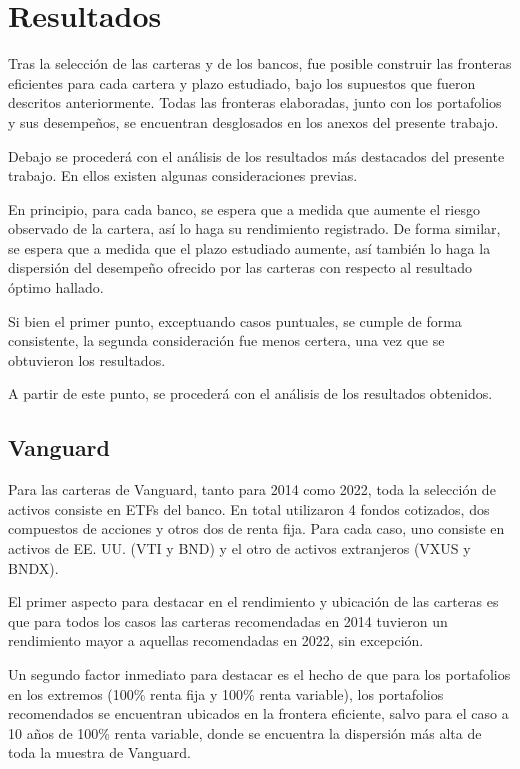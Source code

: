 \documentclass[a4paper,fleqn]{cas-sc}
\begin{document}
\section{Resultados}
Tras la selección de las carteras y de los bancos, fue posible construir las fronteras eficientes para cada cartera y plazo estudiado, bajo los supuestos que fueron descritos anteriormente. Todas las fronteras elaboradas, junto con los portafolios y sus desempeños, se encuentran desglosados en los anexos del presente trabajo. 

Debajo se procederá con el análisis de los resultados más destacados del presente trabajo. En ellos existen algunas consideraciones previas. 

En principio, para cada banco, se espera que a medida que aumente el riesgo observado de la cartera, así lo haga su rendimiento registrado. De forma similar, se espera que a medida que el plazo estudiado aumente, así también lo haga la dispersión del desempeño ofrecido por las carteras con respecto al resultado óptimo hallado. 

Si bien el primer punto, exceptuando casos puntuales, se cumple de forma consistente, la segunda consideración fue menos certera, una vez que se obtuvieron los resultados.

A partir de este punto, se procederá con el análisis de los resultados obtenidos.

\subsection{Vanguard}
Para las carteras de Vanguard, tanto para 2014 como 2022, toda la selección de activos consiste en ETFs del banco. En total utilizaron 4 fondos cotizados, dos compuestos de acciones y otros dos de renta fija. Para cada caso, uno consiste en activos de EE. UU. (VTI y BND) y el otro de activos extranjeros (VXUS y BNDX). 

El primer aspecto para destacar en el rendimiento y ubicación de las carteras es que para todos los casos las carteras recomendadas en 2014 tuvieron un rendimiento mayor a aquellas recomendadas en 2022, sin excepción. 

Un segundo factor inmediato para destacar es el hecho de que para los portafolios en los extremos (100\% renta fija y 100\% renta variable), los portafolios recomendados se encuentran ubicados en la frontera eficiente, salvo para el caso a 10 años de 100\% renta variable, donde se encuentra la dispersión más alta de toda la muestra de Vanguard.
\end{document}
